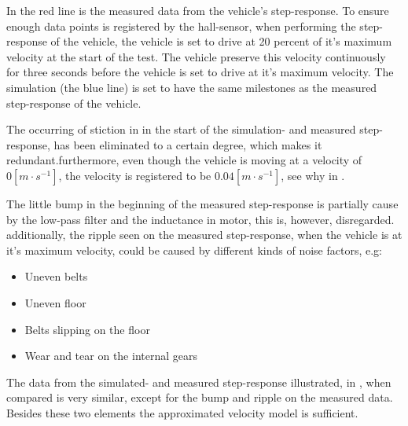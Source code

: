 In  the red line is the measured data from the vehicle's step-response. To ensure enough data points is registered by the hall-sensor, when performing the step-response of the vehicle, the vehicle is set to drive at 20 percent of it's maximum velocity at the start of the test. The vehicle preserve this velocity continuously for three seconds before the vehicle is set to drive at it's maximum velocity. The simulation (the blue line) is set to have the same milestones as the measured step-response of the vehicle. 

The occurring of stiction in in the start of the simulation- and measured step-response, has been eliminated to a certain degree, which makes it redundant.furthermore, even though the vehicle is moving at a velocity of $0 [m \cdot s^{-1}]$, the velocity is registered to be $0.04 [m \cdot s^{-1}]$, see why in . 

The little bump in the beginning of the measured step-response is partially cause by the low-pass filter and the inductance in motor, this is, however, disregarded. additionally, the ripple seen on the measured step-response, when the vehicle is at it's maximum velocity, could be caused by different kinds of noise factors, e.g:

\begin{itemize}
\item Uneven belts 
\item Uneven floor
\item Belts slipping on the floor
\item Wear and tear on the internal gears
\end{itemize}

The data from the simulated- and measured step-response illustrated, in , when compared is very similar, except for the bump and ripple on the measured data. Besides these two elements the approximated velocity model is sufficient.
